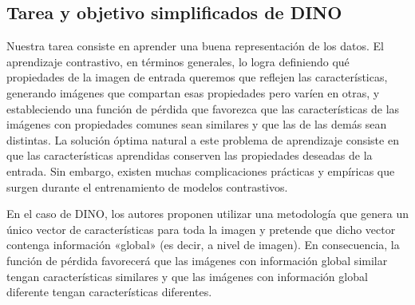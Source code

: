 \documentclass[../../book-main_es.tex]{subfiles}
\begin{document}
\subsection{Tarea y objetivo simplificados de DINO}
\label{sub:contrastive_learning_objective}

Nuestra tarea consiste en aprender una buena representación de los datos. El aprendizaje contrastivo,
en términos generales, lo logra definiendo qué propiedades de la
imagen de entrada queremos que reflejen las características, generando imágenes
que compartan esas propiedades pero varíen en otras, y estableciendo una función de pérdida
que favorezca que las características de las imágenes con propiedades comunes sean
similares y que las de las demás sean distintas. La
solución óptima natural a este problema de aprendizaje consiste en que las
características aprendidas conserven las propiedades deseadas de la entrada.
Sin embargo, existen muchas complicaciones prácticas y empíricas que
surgen durante el entrenamiento de modelos contrastivos.

En el caso de DINO, los autores proponen utilizar una metodología que
genera un único vector de características para toda la imagen y pretende que
dicho vector contenga información «global» (es decir, a nivel de imagen).
En consecuencia, la función de pérdida favorecerá que las imágenes con información global
similar tengan características similares y que las imágenes con información global
diferente tengan características diferentes.
\end{document}
